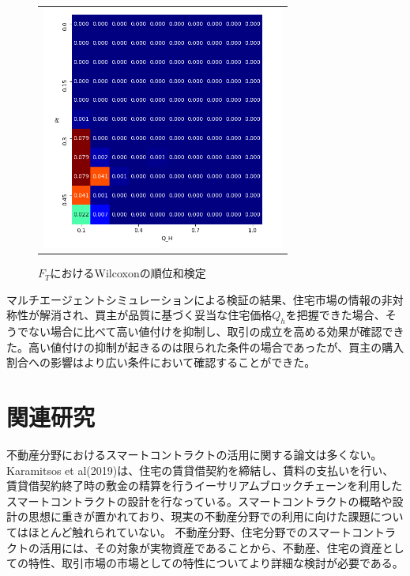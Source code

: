 \documentclass[a4paper,fontsize=11pt,report,notitlepage,line_length=38zw,number_of_lines=40,dvipdfmx]{jlreq}
\begin{document}
\begin{figure}[hbtp]
\begin{center}
\begin{tabular}{c}
      \begin{minipage}{0.5\hsize}
        \begin{center}
          \includegraphics[width=8cm]{wilcoxon_buyer.png}
          \caption{$F_T$におけるWilcoxonの順位和検定}
           \label{wilcoxon_buyer}
        \end{center}
      \end{minipage}
    \end{tabular}
  \end{center}
\end{figure}

マルチエージェントシミュレーションによる検証の結果、住宅市場の情報の非対称性が解消され、買主が品質に基づく妥当な住宅価格$Q_h$を把握できた場合、そうでない場合に比べて高い値付けを抑制し、取引の成立を高める効果が確認できた。高い値付けの抑制が起きるのは限られた条件の場合であったが、買主の購入割合への影響はより広い条件において確認することができた。

\chapter{関連研究}
不動産分野におけるスマートコントラクトの活用に関する論文は多くない。Karamitsos et al(2019)\cite{karamitsos2019}は、住宅の賃貸借契約を締結し、賃料の支払いを行い、賃貸借契約終了時の敷金の精算を行うイーサリアムブロックチェーンを利用したスマートコントラクトの設計を行なっている。スマートコントラクトの概略や設計の思想に重きが置かれており、現実の不動産分野での利用に向けた課題についてはほとんど触れられていない。
不動産分野、住宅分野でのスマートコントラクトの活用には、その対象が実物資産であることから、不動産、住宅の資産としての特性、取引市場の市場としての特性についてより詳細な検討が必要である。
\end{document}

